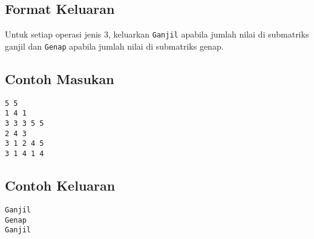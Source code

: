 \documentclass{article}
\begin{document}
\subsection*{Format Keluaran}
Untuk setiap operasi jenis 3, keluarkan \verb|Ganjil| apabila jumlah nilai di submatriks ganjil dan \verb|Genap| apabila jumlah nilai di submatriks genap.

\begin{multicols}{2}
\subsection*{Contoh Masukan}
\begin{lstlisting}
5 5
1 4 1
3 3 3 5 5
2 4 3
3 1 2 4 5
3 1 4 1 4
\end{lstlisting}
\null
\columnbreak
\subsection*{Contoh Keluaran}
\begin{lstlisting}
Ganjil
Genap
Ganjil
\end{lstlisting}
\vfill
\null
\end{multicols}
\end{document}
